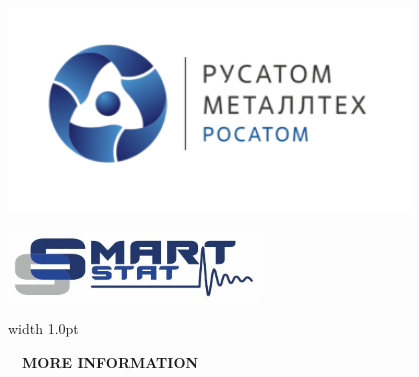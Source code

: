 {\begin{minipage}[t][1.8cm]{.32\textwidth}
    \vspace*{-0.70cm}
    \begin{minipage}{.1\textwidth}
      \hspace{\textwidth}
	\end{minipage}
    \begin{minipage}{.33\textwidth}
	  \begin{center}
	\includegraphics[width=0.8\textwidth]{logos/rusatom-logo-ru.png}
	  \end{center}
	\end{minipage}
    \begin{minipage}{.1\textwidth}
      \hspace{\textwidth}
	\end{minipage}
    \begin{minipage}{.33\textwidth}
	  \begin{center}
	\includegraphics[width=0.50\textwidth]{logos/logo-smartstat.jpg}
	  \end{center}
	\end{minipage}
    \begin{minipage}{.1\textwidth}
      \hspace{\textwidth}
	\end{minipage}
  \end{minipage}
  \hfill{\vline width 1.0pt}\hfill
  \begin{minipage}[t][1.8cm]{.32\textwidth}

  $\quad$\textbf{\hspace{0.0cm}\small\color{skgreen}MORE INFORMATION} \vspace{-0.35cm}\\ 

   \hspace{0.25cm}
    \begin{minipage}{.64\textwidth}
    \vspace{0.15cm}
    \color{skgray}


\end{minipage}
\end{minipage}}
